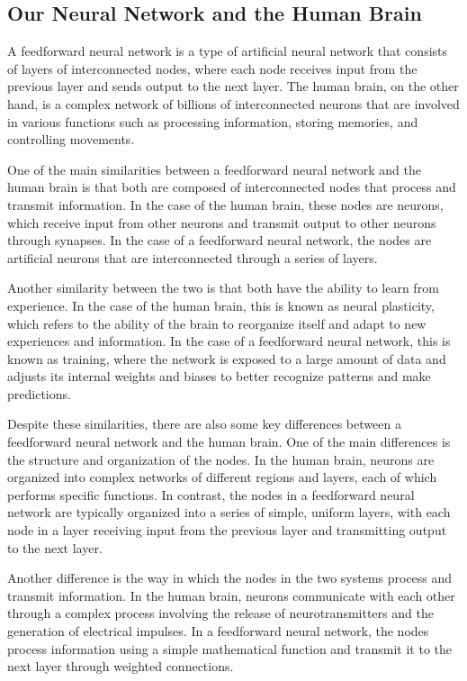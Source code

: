 \documentclass[11pt]{article}
\begin{document}
\subsection{Our Neural Network and the Human Brain}
A feedforward neural network is a type of artificial neural network that consists of layers of interconnected nodes, where each node receives input from the previous layer and sends output to the next layer. The human brain, on the other hand, is a complex network of billions of interconnected neurons that are involved in various functions such as processing information, storing memories, and controlling movements.

One of the main similarities between a feedforward neural network and the human brain is that both are composed of interconnected nodes that process and transmit information. In the case of the human brain, these nodes are neurons, which receive input from other neurons and transmit output to other neurons through synapses. In the case of a feedforward neural network, the nodes are artificial neurons that are interconnected through a series of layers.

Another similarity between the two is that both have the ability to learn from experience. In the case of the human brain, this is known as neural plasticity, which refers to the ability of the brain to reorganize itself and adapt to new experiences and information. In the case of a feedforward neural network, this is known as training, where the network is exposed to a large amount of data and adjusts its internal weights and biases to better recognize patterns and make predictions.

Despite these similarities, there are also some key differences between a feedforward neural network and the human brain. One of the main differences is the structure and organization of the nodes. In the human brain, neurons are organized into complex networks of different regions and layers, each of which performs specific functions. In contrast, the nodes in a feedforward neural network are typically organized into a series of simple, uniform layers, with each node in a layer receiving input from the previous layer and transmitting output to the next layer.

Another difference is the way in which the nodes in the two systems process and transmit information. In the human brain, neurons communicate with each other through a complex process involving the release of neurotransmitters and the generation of electrical impulses. In a feedforward neural network, the nodes process information using a simple mathematical function and transmit it to the next layer through weighted connections.
\end{document}
